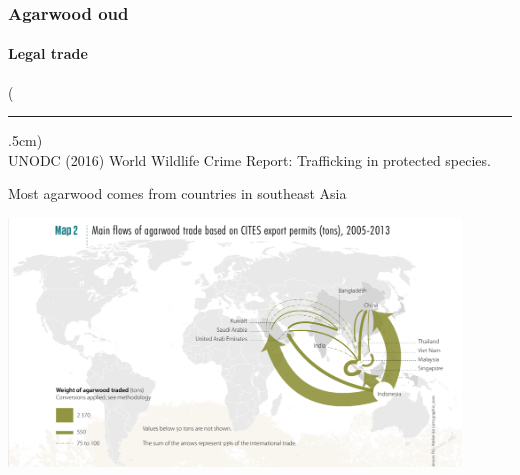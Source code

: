 \documentclass[10pt]{beamer}
\newenvironment{reference}[2]{%
	\begin{textblock*}{\textwidth}(#1,#2)
		\tiny\bgroup\color{gray}}{\egroup\end{textblock*}}
\begin{document}
\begin{frame}[t]
\frametitle{Agarwood oud}
\framesubtitle{Legal trade}
\vspace{0.5cm}

	\begin{reference}{4mm}{92mm}
		\rule{1.5cm}{0.25pt}\\
		UNODC (2016) World Wildlife Crime Report: Trafficking in protected species.
	\end{reference}

	Most agarwood comes from countries in southeast Asia\\
	
	\vspace{0.25cm}
	
	\begin{center}
		\includegraphics[width=0.9\textwidth]{figures/map4a.png}
	\end{center}	
\end{frame}
\end{document}
